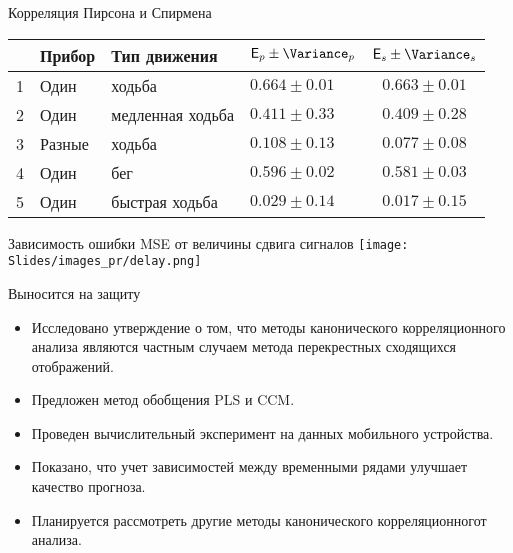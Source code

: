 \documentclass[9pt]{beamer}
\begin{document}
\begin{frame}
\begin{block}{Корреляция Пирсона и Спирмена}
\vspace{0.05cm}
\begin{table}[bhtp]
	\centering
	\label{tbl:methods}
	\begin{tabular}{l|l|l|l|c}
		\hline
	      &  Прибор & Тип движения & $\mathsf{E}_p\pm\Variance_p$ & $\mathsf{E}_s\pm\Variance_s$  \\
		\hline
	1 &  Один & ходьба & $0.664\pm0.01$ & $0.663\pm0.01$        \\
	2 &  Один & медленная ходьба & $0.411\pm0.33$ & $0.409\pm0.28$  \\
	3 &	 Разные & ходьба & $0.108\pm0.13 $ & $0.077\pm0.08 $ \\
	4 &	 Один & бег & $0.596\pm0.02 $ & $0.581\pm0.03$  \\
	5 &	 Один & быстрая ходьба & $0.029\pm0.14$ & $0.017\pm0.15$  \\

		\hline   
	\end{tabular}
\end{table}
\end{block}
\vspace{-0.3cm}
\begin{block}{Зависимость ошибки MSE от величины сдвига сигналов}
\vspace{-0.05cm}
\texttt{[image: Slides/images\_pr/delay.png]}
\end{block}

\end{frame}

\begin{frame}{Выносится на защиту}
\begin{itemize}
	\item Исследовано утверждение о том, что методы канонического корреляционного анализа являются частным случаем метода перекрестных сходящихся отображений.
	\vfill
	\item Предложен метод обобщения PLS и CCM.
	\vfill
	\item Проведен вычислительный эксперимент на данных мобильного устройства.
	\vfill
	\item Показано, что учет зависимостей между временными рядами улучшает качество прогноза.
	\vfill
	\item Планируется рассмотреть другие методы канонического корреляционногот анализа.
\end{itemize}
\end{frame}
\end{document}
